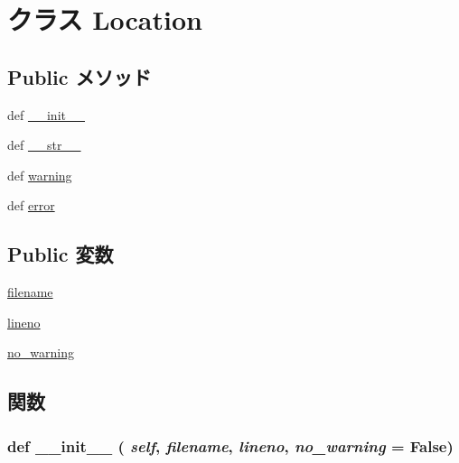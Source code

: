 \hypertarget{classslicc_1_1util_1_1Location}{
\section{クラス Location}
\label{classslicc_1_1util_1_1Location}
}
\subsection*{Public メソッド}
\begin{DoxyCompactItemize}
\item 
def \hyperlink{classslicc_1_1util_1_1Location_ac775ee34451fdfa742b318538164070e}{\_\-\_\-init\_\-\_\-}
\item 
def \hyperlink{classslicc_1_1util_1_1Location_aa7a4b9bc0941308e362738503137460e}{\_\-\_\-str\_\-\_\-}
\item 
def \hyperlink{classslicc_1_1util_1_1Location_ac1fc7cd7c75bbbeb7fcd0ada8bf86b81}{warning}
\item 
def \hyperlink{classslicc_1_1util_1_1Location_a3133d4a0dde10b6ebe257e3db716a3e0}{error}
\end{DoxyCompactItemize}
\subsection*{Public 変数}
\begin{DoxyCompactItemize}
\item 
\hyperlink{classslicc_1_1util_1_1Location_a2ff994e16bf9521154de4cf659a3b689}{filename}
\item 
\hyperlink{classslicc_1_1util_1_1Location_a20bfe3cddeded33e0531d53de5bdaef5}{lineno}
\item 
\hyperlink{classslicc_1_1util_1_1Location_a38c7630257a6dd9fb890c668ff728264}{no\_\-warning}
\end{DoxyCompactItemize}


\subsection{関数}
\hypertarget{classslicc_1_1util_1_1Location_ac775ee34451fdfa742b318538164070e}{
\subsubsection[{\_\-\_\-init\_\-\_\-}]{\setlength{\rightskip}{0pt plus 5cm}def \_\-\_\-init\_\-\_\- ( {\em self}, \/   {\em filename}, \/   {\em lineno}, \/   {\em no\_\-warning} = {\ttfamily False})}}
\label{classslicc_1_1util_1_1Location_ac775ee34451fdfa742b318538164070e}



